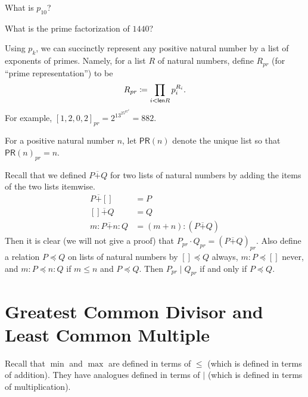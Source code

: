 \begin{exer}
\begin{exercise}
	\item What is $p_10$?
	\item What is the prime factorization of $1440$?
\end{exercise}
\end{exer}

Using $p_k$, we can succinctly represent any positive natural number by a list of exponents of primes.
Namely, for a list $R$ of natural numbers, define $R_{pr}$ (for ``prime representation'') to be 
\[R_{pr} \coloneqq \prod_{i<\mathord{\textsf{len}} R}p_i^{R_i}.\]
For example, $[1,2,0,2]_{pr} = 2^13^25^07^2 = 882$.

For a positive natural number $n$, let $\mathord{\textsf{PR}}(n)$ denote the unique list so that $\mathord{\textsf{PR}}(n)_{pr}=n$.

Recall that we defined $P \overline+ Q$ for two lists of natural numbers by adding the items of the two lists itemwise.
\begin{align*}
	P\overline+ [] &= P\\
	[]\overline+ Q &= Q\\
	m:P\overline+ n:Q &= (m+n):(P\overline+ Q)
\end{align*}
Then it is clear (we will not give a proof) that 
$P_{pr}\cdot Q_{pr} = (P\overline+ Q)_{pr}$.
Also  define a relation $P\preceq Q$ on lists of natural numbers by $[]\preceq Q$ always,
$m:P\preceq []$ never, and $m:P\preceq n:Q$ if $m\leq n$ and $P\preceq Q$. Then $P_{pr}\mid Q_{pr}$ if and only if $P\preceq Q$.


\section{Greatest Common Divisor and Least Common Multiple}

Recall that $\min$ and $\max$ are defined in terms of $\leq$ (which
is defined in terms of addition). They
have analogues defined in terms of $\mid$ (which  is defined in
terms of multiplication).

